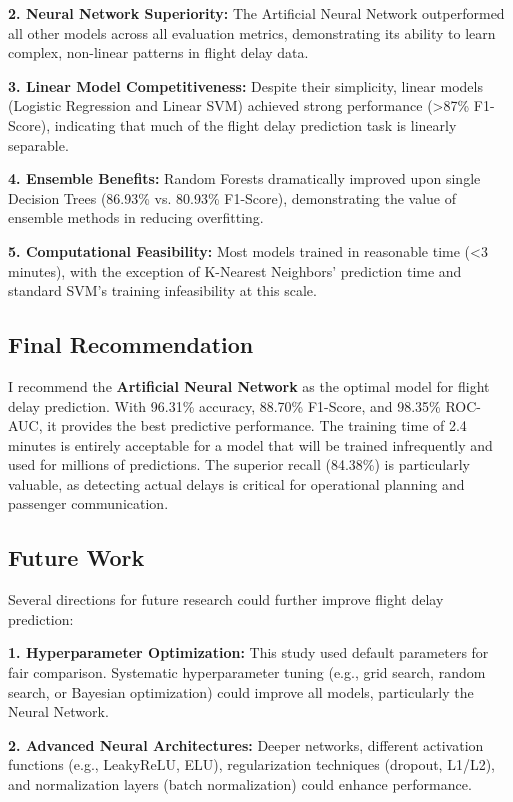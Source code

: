 \documentclass[sigconf]{acmart}
\begin{document}
\textbf{2. Neural Network Superiority:} The Artificial Neural Network outperformed all other models across all evaluation metrics, demonstrating its ability to learn complex, non-linear patterns in flight delay data.

\textbf{3. Linear Model Competitiveness:} Despite their simplicity, linear models (Logistic Regression and Linear SVM) achieved strong performance (>87\% F1-Score), indicating that much of the flight delay prediction task is linearly separable.

\textbf{4. Ensemble Benefits:} Random Forests dramatically improved upon single Decision Trees (86.93\% vs. 80.93\% F1-Score), demonstrating the value of ensemble methods in reducing overfitting.

\textbf{5. Computational Feasibility:} Most models trained in reasonable time (<3 minutes), with the exception of K-Nearest Neighbors' prediction time and standard SVM's training infeasibility at this scale.

\subsection{Final Recommendation}

I recommend the \textbf{Artificial Neural Network} as the optimal model for flight delay prediction. With 96.31\% accuracy, 88.70\% F1-Score, and 98.35\% ROC-AUC, it provides the best predictive performance. The training time of 2.4 minutes is entirely acceptable for a model that will be trained infrequently and used for millions of predictions. The superior recall (84.38\%) is particularly valuable, as detecting actual delays is critical for operational planning and passenger communication.

\subsection{Future Work}

Several directions for future research could further improve flight delay prediction:

\textbf{1. Hyperparameter Optimization:} This study used default parameters for fair comparison. Systematic hyperparameter tuning (e.g., grid search, random search, or Bayesian optimization) could improve all models, particularly the Neural Network.

\textbf{2. Advanced Neural Architectures:} Deeper networks, different activation functions (e.g., LeakyReLU, ELU), regularization techniques (dropout, L1/L2), and normalization layers (batch normalization) could enhance performance.
\end{document}
